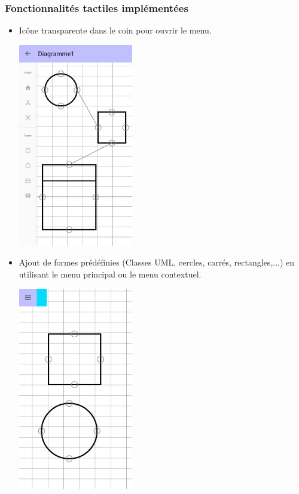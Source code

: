 \subsubsection{Fonctionnalités tactiles implémentées}
\begin{itemize}
\item Icône transparente dans le coin pour ouvrir le menu.\par
		\begin{minipage}{\linewidth}
			\centering
			\includegraphics[width=5cm]{img/screen/new/colladia_draw_view_menu_main}
		\end{minipage}
\item Ajout de formes prédéfinies (Classes UML, cercles, carrés, rectangles,...) en utilisant le menu principal ou le menu contextuel.\par
		\begin{minipage}{\linewidth}
			\centering
			\includegraphics[width=5cm]{img/screen/colladia_draw_view_element_2}

\end{minipage}
\end{itemize}
